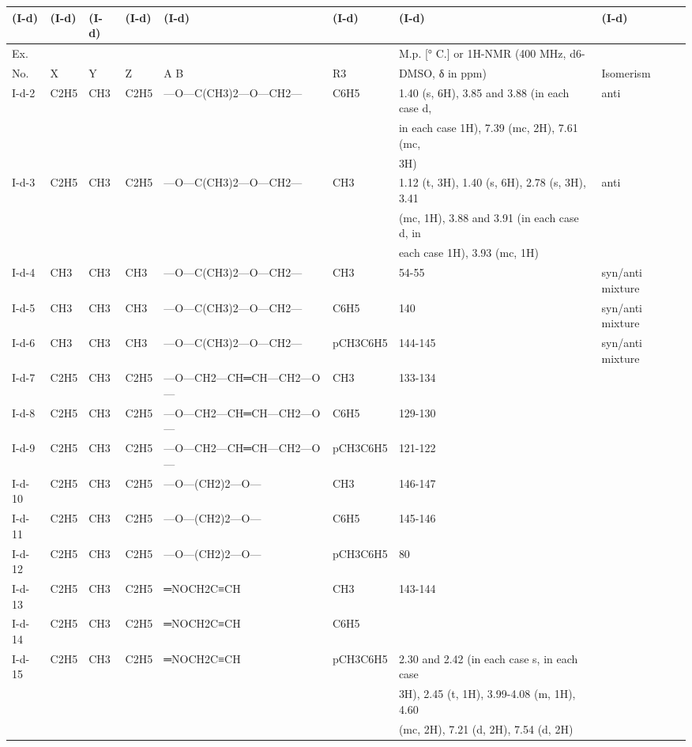 \documentclass[11pt,a4paper]{article}
\begin{document}
\begin{table}[h]
\begin{tabular}{|l|l|l|l|l|l|l|l|}
\hline
(I-d) & (I-d) & (I-d) & (I-d) & (I-d) & (I-d) & (I-d) & (I-d) \\ \hline
Ex. &  &  &  &  &  & M.p. [° C.] or 1H-NMR (400 MHz, d6- &  \\ \hline
No. & X & Y & Z & A B & R3 & DMSO, δ in ppm) & Isomerism \\ \hline
I-d-2 & C2H5 & CH3 & C2H5 & —O—C(CH3)2—O—CH2— & C6H5 & 1.40 (s, 6H), 3.85 and 3.88 (in each case d, & anti \\ \hline
 &  &  &  &  &  & in each case 1H), 7.39 (mc, 2H), 7.61 (mc, &  \\ \hline
 &  &  &  &  &  & 3H) &  \\ \hline
I-d-3 & C2H5 & CH3 & C2H5 & —O—C(CH3)2—O—CH2— & CH3 & 1.12 (t, 3H), 1.40 (s, 6H), 2.78 (s, 3H), 3.41 & anti \\ \hline
 &  &  &  &  &  & (mc, 1H), 3.88 and 3.91 (in each case d, in &  \\ \hline
 &  &  &  &  &  & each case 1H), 3.93 (mc, 1H) &  \\ \hline
I-d-4 & CH3 & CH3 & CH3 & —O—C(CH3)2—O—CH2— & CH3 & 54-55 & syn/anti mixture \\ \hline
I-d-5 & CH3 & CH3 & CH3 & —O—C(CH3)2—O—CH2— & C6H5 & 140 & syn/anti mixture \\ \hline
I-d-6 & CH3 & CH3 & CH3 & —O—C(CH3)2—O—CH2— & pCH3C6H5 & 144-145 & syn/anti mixture \\ \hline
I-d-7 & C2H5 & CH3 & C2H5 & —O—CH2—CH═CH—CH2—O— & CH3 & 133-134 &  \\ \hline
I-d-8 & C2H5 & CH3 & C2H5 & —O—CH2—CH═CH—CH2—O— & C6H5 & 129-130 &  \\ \hline
I-d-9 & C2H5 & CH3 & C2H5 & —O—CH2—CH═CH—CH2—O— & pCH3C6H5 & 121-122 &  \\ \hline
I-d-10 & C2H5 & CH3 & C2H5 & —O—(CH2)2—O— & CH3 & 146-147 &  \\ \hline
I-d-11 & C2H5 & CH3 & C2H5 & —O—(CH2)2—O— & C6H5 & 145-146 &  \\ \hline
I-d-12 & C2H5 & CH3 & C2H5 & —O—(CH2)2—O— & pCH3C6H5 & 80 &  \\ \hline
I-d-13 & C2H5 & CH3 & C2H5 & ═NOCH2C≡CH & CH3 & 143-144 &  \\ \hline
I-d-14 & C2H5 & CH3 & C2H5 & ═NOCH2C≡CH & C6H5 &  &  \\ \hline
I-d-15 & C2H5 & CH3 & C2H5 & ═NOCH2C≡CH & pCH3C6H5 & 2.30 and 2.42 (in each case s, in each case &  \\ \hline
 &  &  &  &  &  & 3H), 2.45 (t, 1H), 3.99-4.08 (m, 1H), 4.60 &  \\ \hline
 &  &  &  &  &  & (mc, 2H), 7.21 (d, 2H), 7.54 (d, 2H) &  \\ \hline
\end{tabular}
\end{table}
\end{document}
